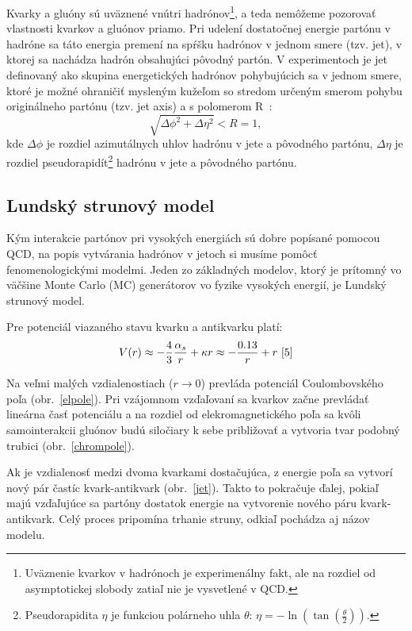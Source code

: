 \documentclass[thesismargins, thesislinespacing]{rnthesis}
\begin{document}
Kvarky a gluóny sú uväznené vnútri hadrónov\footnote{Uväznenie kvarkov v hadrónoch je experimenálny fakt, ale na rozdiel od asymptotickej slobody zatiaľ nie je vysvetlené v QCD.}, a teda nemôžeme pozorovať vlastnosti kvarkov a gluónov priamo. Pri udelení dostatočnej energie partónu v hadróne sa táto energia premení na spŕšku hadrónov v jednom smere (tzv. jet), v ktorej sa nachádza hadrón obsahujúci pôvodný partón. V experimentoch je jet definovaný ako skupina energe\-tických hadrónov pohybujúcich sa v jednom smere, ktoré je možné ohraničiť mysleným kužeľom so stredom určeným smerom pohybu originálneho partónu (tzv. jet axis) a s polomerom R~\cite{4}:
\begin{equation}
\sqrt{\Delta \phi^2 + \Delta \eta^2}<R=1,
\end{equation}
kde $\Delta \phi$ je rozdiel azimutálnych uhlov hadrónu v jete a pôvodného partónu, $\Delta \eta$ je rozdiel pseudorapidít\footnote{Pseudorapidita $\eta$ je funkciou polárneho uhla $\theta$: $\eta = - \ln( \tan (\frac{\theta}{2}))$.} hadrónu v jete a pôvodného partónu.

\subsection{Lundský strunový model}
Kým interakcie partónov pri vysokých energiách sú dobre popísané pomocou QCD, na popis vytvárania hadrónov v jetoch si musíme pomôcť fenomenologickými \-mo\-del\-mi. Jeden zo základných modelov, ktorý je prítomný vo väčšine Monte Carlo (MC) generátorov vo fyzike vysokých energií, je Lundský strunový model.

Pre potenciál viazaného stavu kvarku a antikvarku platí:
\begin{equation}
	V(r) \approx - \frac{4}{3} \frac{\alpha_s}{r} + \kappa r \approx - \frac{0.13}{r} + r~\cite{5}
\end{equation}

Na veľmi malých vzdialenostiach ($r\rightarrow0$) prevláda potenciál Coulombovského poľa (obr.~\ref{elpole}). Pri vzájomnom vzďaľovaní sa kvarkov začne prevládať lineárna časť potenciálu a na rozdiel od elekromagnetického poľa sa kvôli samointerakcii gluónov budú siločiary k sebe približovať a vytvoria tvar podobný trubici (obr.~\ref{chrompole}).

Ak je vzdialenosť medzi dvoma kvarkami dostačujúca, z energie poľa sa vytvorí nový pár častíc kvark-antikvark (obr.~\ref{jet}). Takto to pokračuje ďalej, pokiaľ majú vzďaľujúce sa partóny dostatok energie na vytvorenie nového páru kvark-antikvark. Celý proces pripomína trhanie struny, odkiaľ pochádza aj názov modelu.
\end{document}
